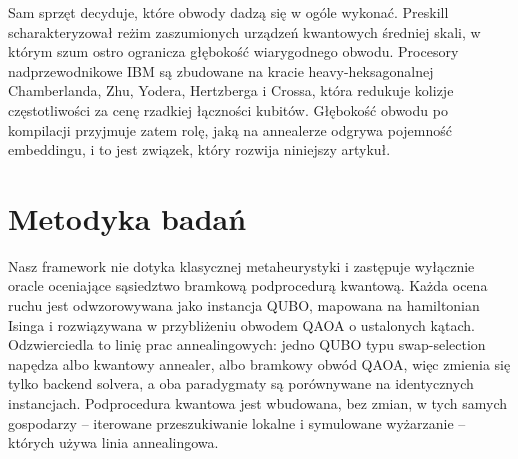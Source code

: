 \documentclass[11pt,a4paper]{article}
\begin{document}
Sam sprzęt decyduje, które obwody dadzą się w ogóle wykonać. Preskill
scharakteryzował reżim zaszumionych urządzeń kwantowych średniej skali,
w którym szum ostro ogranicza głębokość wiarygodnego obwodu. Procesory
nadprzewodnikowe IBM są zbudowane na kracie heavy-heksagonalnej Chamberlanda,
Zhu, Yodera, Hertzberga i Crossa, która redukuje kolizje częstotliwości za
cenę rzadkiej łączności kubitów. Głębokość obwodu po kompilacji przyjmuje
zatem rolę, jaką na annealerze odgrywa pojemność embeddingu, i to jest
związek, który rozwija niniejszy artykuł.

\section{Metodyka badań}
\label{sec:method}

Nasz framework nie dotyka klasycznej metaheurystyki i zastępuje wyłącznie
oracle oceniające sąsiedztwo bramkową podprocedurą kwantową. Każda ocena ruchu
jest odwzorowywana jako instancja QUBO, mapowana na hamiltonian Isinga
i rozwiązywana w przybliżeniu obwodem QAOA o ustalonych kątach. Odzwierciedla
to linię prac annealingowych: jedno QUBO typu swap-selection napędza albo
kwantowy annealer, albo bramkowy obwód QAOA, więc zmienia się tylko backend
solvera, a oba paradygmaty są porównywane na identycznych instancjach.
Podprocedura kwantowa jest wbudowana, bez zmian, w tych samych gospodarzy --
iterowane przeszukiwanie lokalne i symulowane wyżarzanie -- których używa
linia annealingowa.
\end{document}
